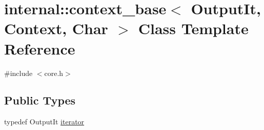 \hypertarget{classinternal_1_1context__base}{}\section{internal\+:\+:context\+\_\+base$<$ Output\+It, Context, Char $>$ Class Template Reference}
\label{classinternal_1_1context__base}


{\ttfamily \#include $<$core.\+h$>$}

\subsection*{Public Types}
\begin{DoxyCompactItemize}
\item 
typedef Output\+It \hyperlink{classinternal_1_1context__base_a6486e3c9656c10eb99a4731fb169e51b}{iterator}
\end{DoxyCompactItemize}

